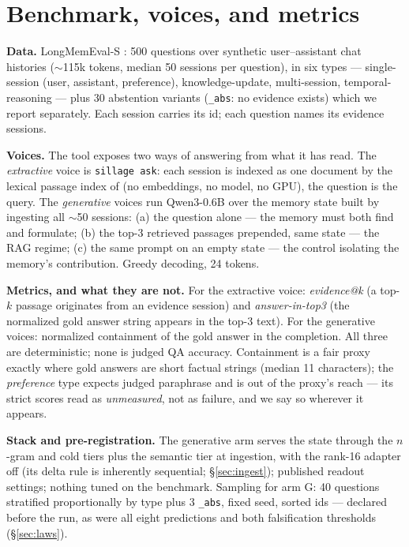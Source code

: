 \documentclass[11pt]{article}
\begin{document}
\section{Benchmark, voices, and metrics}\label{sec:setup}

\textbf{Data.} LongMemEval-S \cite{longmemeval}: 500 questions over synthetic user--assistant chat histories ($\sim$115k tokens, median 50 sessions per question), in six types --- single-session (user, assistant, preference), knowledge-update, multi-session, temporal-reasoning --- plus 30 abstention variants (\texttt{\_abs}: no evidence exists) which we report separately. Each session carries its id; each question names its evidence sessions.

\textbf{Voices.} The tool exposes two ways of answering from what it has read. The \emph{extractive} voice is \texttt{sillage ask}: each session is indexed as one document by the lexical passage index of \cite{sillage} (no embeddings, no model, no GPU), the question is the query. The \emph{generative} voices run Qwen3-0.6B \cite{qwen3} over the memory state built by ingesting all $\sim$50 sessions: (a) the question alone --- the memory must both find and formulate; (b) the top-3 retrieved passages prepended, same state --- the RAG regime; (c) the same prompt on an empty state --- the control isolating the memory's contribution. Greedy decoding, 24 tokens.

\textbf{Metrics, and what they are not.} For the extractive voice: \emph{evidence@k} (a top-$k$ passage originates from an evidence session) and \emph{answer-in-top3} (the normalized gold answer string appears in the top-3 text). For the generative voices: normalized containment of the gold answer in the completion. All three are deterministic; none is judged QA accuracy. Containment is a fair proxy exactly where gold answers are short factual strings (median 11 characters); the \emph{preference} type expects judged paraphrase and is out of the proxy's reach --- its strict scores read as \emph{unmeasured}, not as failure, and we say so wherever it appears.

\textbf{Stack and pre-registration.} The generative arm serves the state through the $n$-gram and cold tiers plus the semantic tier at ingestion, with the rank-16 adapter off (its delta rule is inherently sequential; \S\ref{sec:ingest}); published readout settings; nothing tuned on the benchmark. Sampling for arm G: 40 questions stratified proportionally by type plus 3 \texttt{\_abs}, fixed seed, sorted ids --- declared before the run, as were all eight predictions and both falsification thresholds (\S\ref{sec:laws}).
\end{document}
